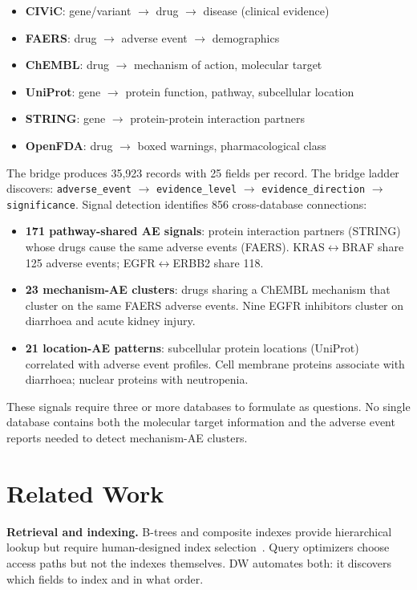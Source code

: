 \documentclass[11pt]{article}
\begin{document}
\begin{itemize}
    \item \textbf{CIViC}: gene/variant $\to$ drug $\to$ disease (clinical evidence)
    \item \textbf{FAERS}: drug $\to$ adverse event $\to$ demographics
    \item \textbf{ChEMBL}: drug $\to$ mechanism of action, molecular target
    \item \textbf{UniProt}: gene $\to$ protein function, pathway, subcellular location
    \item \textbf{STRING}: gene $\to$ protein-protein interaction partners
    \item \textbf{OpenFDA}: drug $\to$ boxed warnings, pharmacological class
\end{itemize}

The bridge produces 35{,}923 records with 25 fields per record. The bridge ladder discovers: \texttt{adverse\_event} $\to$ \texttt{evidence\_level} $\to$ \texttt{evidence\_direction} $\to$ \texttt{significance}. Signal detection identifies 856 cross-database connections:

\begin{itemize}
    \item \textbf{171 pathway-shared AE signals}: protein interaction partners (STRING) whose drugs cause the same adverse events (FAERS). KRAS$\leftrightarrow$BRAF share 125 adverse events; EGFR$\leftrightarrow$ERBB2 share 118.
    \item \textbf{23 mechanism-AE clusters}: drugs sharing a ChEMBL mechanism that cluster on the same FAERS adverse events. Nine EGFR inhibitors cluster on diarrhoea and acute kidney injury.
    \item \textbf{21 location-AE patterns}: subcellular protein locations (UniProt) correlated with adverse event profiles. Cell membrane proteins associate with diarrhoea; nuclear proteins with neutropenia.
\end{itemize}

These signals require three or more databases to formulate as questions. No single database contains both the molecular target information and the adverse event reports needed to detect mechanism-AE clusters.

\section{Related Work}

\textbf{Retrieval and indexing.} B-trees and composite indexes provide hierarchical lookup but require human-designed index selection~\cite{silberschatz2020}. Query optimizers choose access paths but not the indexes themselves. DW automates both: it discovers which fields to index and in what order.
\end{document}
